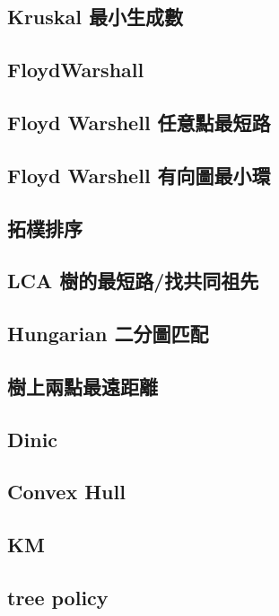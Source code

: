 \subsection{Kruskal 最小生成數}

\subsection{FloydWarshall}

\subsection{Floyd Warshell 任意點最短路}

\subsection{Floyd Warshell 有向圖最小環}

\subsection{拓樸排序}

\subsection{LCA 樹的最短路/找共同祖先}

\subsection{Hungarian 二分圖匹配}

\subsection{樹上兩點最遠距離}

\subsection{Dinic}

\subsection{Convex Hull}

\subsection{KM}

\subsection{tree policy}


